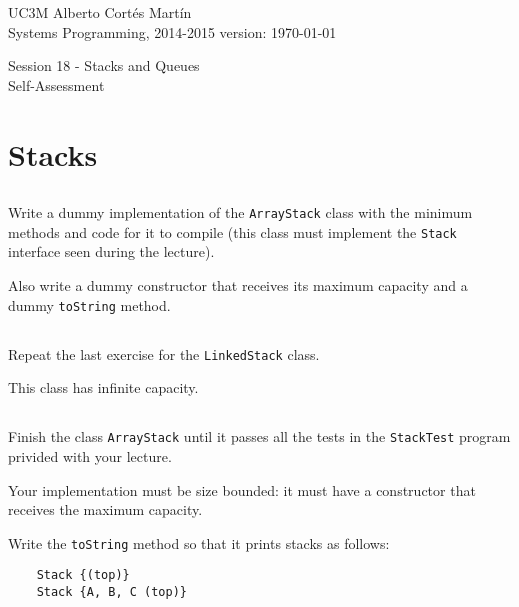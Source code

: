 \documentclass[a4paper, 11pt]{article}
\newcommand{\realtitle}{Session 18 - Stacks and Queues}
\begin{document}
\makebox[\linewidth]{\rule{\textwidth}{0.4pt}}
UC3M \hfill Alberto Cortés Martín\\
Systems Programming, 2014-2015 \hfill version: \today\\
\makebox[\linewidth]{\rule{\textwidth}{0.4pt}}
\begin{center}
  \Large{\realtitle}\\Self-Assessment
\end{center}
\makebox[\linewidth]{\rule{\textwidth}{0.4pt}}
\vspace{1cm}


\section{Stacks}

\subsection{}

Write a dummy implementation of the \texttt{ArrayStack} class with the minimum
methods and code for it to compile (this class must implement the
\texttt{Stack} interface seen during the lecture).

Also write a dummy constructor that receives its maximum capacity and a dummy
\verb+toString+ method.

\subsection{}

Repeat the last exercise for the \texttt{LinkedStack} class.

This class has infinite capacity.

\subsection{}

Finish the class \texttt{ArrayStack} until it passes all the tests in the
\verb+StackTest+ program privided with your lecture.

Your implementation must be size bounded: it must have a constructor that
receives the maximum capacity.

Write the \verb+toString+ method so that it prints stacks as follows:

\begin{verbatim}
    Stack {(top)}
    Stack {A, B, C (top)}
\end{verbatim}
\end{document}
